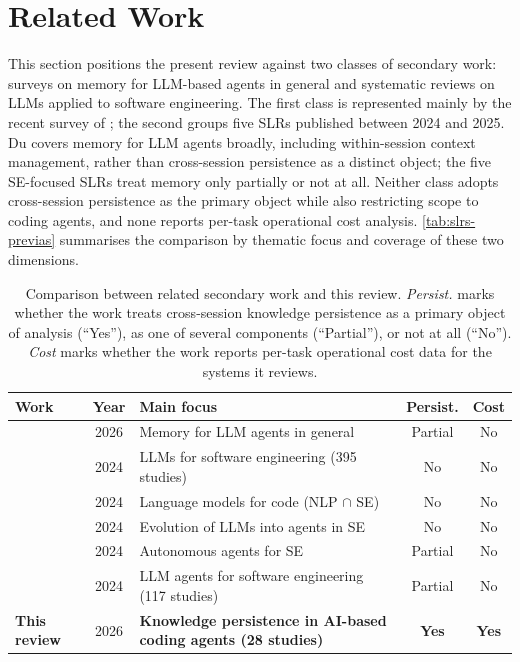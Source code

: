 \section{Related Work}
\label{sec:related-work}


This section positions the present review against two classes of
secondary work: surveys on memory for LLM-based agents in general and
systematic reviews on LLMs applied to software engineering.
The first class is represented mainly by the recent survey of
\citet{du2026memory};
the second groups five SLRs published between 2024 and 2025.
Du covers memory for LLM agents broadly, including within-session
context management, rather than cross-session persistence as a
distinct object;
the five SE-focused SLRs treat memory only partially or not at all.
Neither class adopts cross-session persistence as the primary object
while also restricting scope to coding agents, and none reports
per-task operational cost analysis.
\autoref{tab:slrs-previas} summarises the comparison by thematic focus
and coverage of these two dimensions.

\begin{table}[htbp]
\centering
\caption{Comparison between related secondary work and this review.
\emph{Persist.} marks whether the work treats cross-session knowledge
persistence as a primary object of analysis (``Yes''), as one of several
components (``Partial''), or not at all (``No'').
\emph{Cost} marks whether the work reports per-task operational cost
data for the systems it reviews.}
\label{tab:slrs-previas}
\small
\setlength{\tabcolsep}{4pt}
\begin{tabularx}{\textwidth}{@{} l c >{\raggedright\arraybackslash}X c c @{}}
\toprule
\textbf{Work} & \textbf{Year} & \textbf{Main focus} &
  \textbf{Persist.} & \textbf{Cost} \\
\midrule
\citet{du2026memory} & 2026 &
  Memory for LLM agents in general &
  Partial & No \\
\citet{hou2024llmse} & 2024 &
  LLMs for software engineering (395 studies) &
  No & No \\
\citet{zhang2024unifying} & 2024 &
  Language models for code (NLP $\cap$ SE) &
  No & No \\
\citet{jin2024llmagents} & 2024 &
  Evolution of LLMs into agents in SE &
  No & No \\
\citet{wang2024llmagents} & 2024 &
  Autonomous agents for SE &
  Partial & No \\
\citet{liu2024llmagents} & 2024 &
  LLM agents for software engineering (117 studies) &
  Partial & No \\
\midrule
\textbf{This review} & 2026 &
  \textbf{Knowledge persistence in AI-based coding agents
  (28 studies)} &
  \textbf{Yes} & \textbf{Yes} \\
\bottomrule
\end{tabularx}
\end{table}

